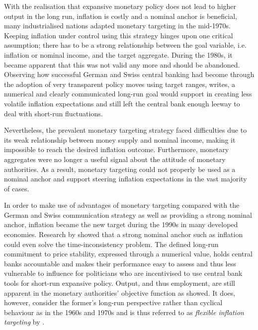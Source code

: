 With the realisation that expansive monetary policy does not lead to higher output in the long run, inflation is costly and a nominal anchor is beneficial, many industrialised nations adapted monetary targeting in the mid-1970s. Keeping inflation under control using this strategy hinges upon one critical assumption; there has to be a strong relationship between the goal variable, i.e. inflation or nominal income, and the target aggregate. During the 1980s, it became apparent that this was not valid any more and should be abandoned. %
Observing how successful German and Swiss central banking had become through the adoption of very transparent policy moves using target ranges, \textcite{Mishkin.2007} writes, a numerical and clearly communicated long-run goal would support in creating less volatile inflation expectations and still left the central bank enough leeway to deal with short-run fluctuations. 

Nevertheless, the prevalent monetary targeting strategy faced difficulties due to its weak relationship between money supply and nominal income, making it impossible to reach the desired inflation outcome. Furthermore, monetary aggregates were no longer a useful signal about the attitude of monetary authorities. As a result, monetary targeting could not properly be used as a nominal anchor and support steering inflation expectations in the vast majority of cases. 

In order to make use of advantages of monetary targeting compared with the German and Swiss communication strategy as well as providing a strong nominal anchor, inflation became the new target during the 1990s in many developed economies. Research by \textcite{Kydland.1977,Calvo.1978,Barro.1983} showed that a strong nominal anchor such as inflation could even solve the time-inconsistency problem. The defined long-run commitment to price stability, expressed through a numerical value, holds central banks accountable and makes their performance easy to assess and thus less vulnerable to influence for politicians who are  incentivised to use central bank tools for short-run expansive policy. Output, and thus employment, are still apparent in the monetary authorities' objective function as \textcite{Svensson.1997} showed. It does, however, consider the former's long-run perspective rather than cyclical behaviour as in the 1960s and 1970s and is thus referred to as \textit{flexible inflation targeting} by \textcite{Mishkin.2007}.

